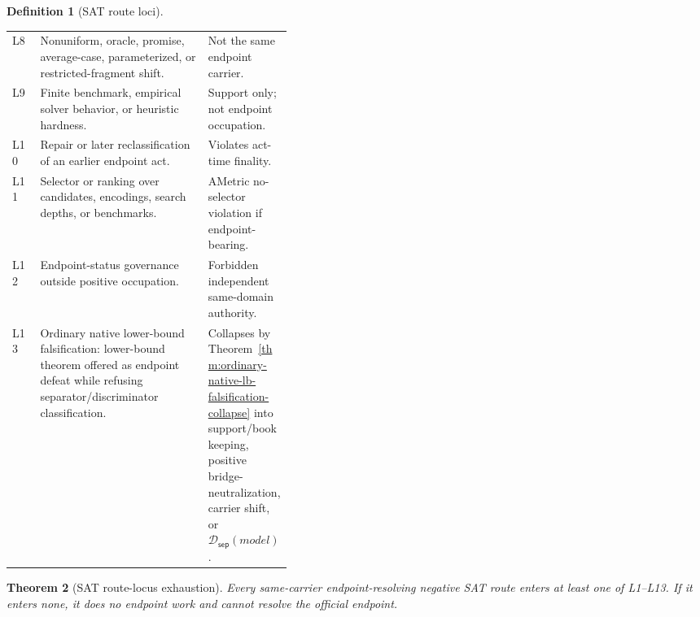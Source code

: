 \documentclass[11pt]{article}
\newtheorem{theorem}{Theorem}[section]
\theoremstyle{definition}
\newtheorem{definition}[theorem]{Definition}
\theoremstyle{remark}
\newcommand{\SepDisc}{\mathcal{D}_{\mathsf{sep}}}
\begin{document}
\begin{definition}[SAT route loci]
\begin{center}
\begin{tabularx}{\linewidth}{>{\raggedright\arraybackslash}p{0.10\linewidth}>{\raggedright\arraybackslash}X>{\raggedright\arraybackslash}p{0.30\linewidth}}
L8 & Nonuniform, oracle, promise, average-case, parameterized, or restricted-fragment shift. & Not the same endpoint carrier. \\
L9 & Finite benchmark, empirical solver behavior, or heuristic hardness. & Support only; not endpoint occupation. \\
L10 & Repair or later reclassification of an earlier endpoint act. & Violates act-time finality. \\
L11 & Selector or ranking over candidates, encodings, search depths, or benchmarks. & AMetric no-selector violation if endpoint-bearing. \\
L12 & Endpoint-status governance outside positive occupation. & Forbidden independent same-domain authority. \\
L13 & Ordinary native lower-bound falsification: lower-bound theorem offered as endpoint defeat while refusing separator/discriminator classification. & Collapses by Theorem~\ref{thm:ordinary-native-lb-falsification-collapse} into support/bookkeeping, positive bridge-neutralization, carrier shift, or \(\SepDisc(model)\). \\
\bottomrule
\end{tabularx}
\end{center}
\end{definition}

\begin{theorem}[SAT route-locus exhaustion]\label{thm:sat-route-locus-exhaustion}
Every same-carrier endpoint-resolving negative SAT route enters at least one of L1--L13. If it enters none, it does no endpoint work and cannot resolve the official endpoint.
\end{theorem}
\end{document}

